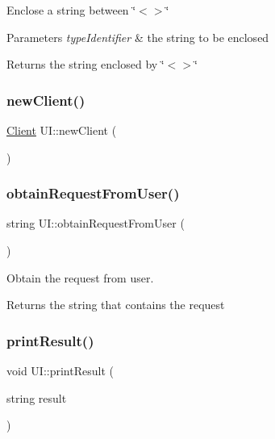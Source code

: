 Enclose a string between \char`\"{}$<$$>$\char`\"{} 
\begin{DoxyParams}{Parameters}
{\em type\+Identifier} & the string to be enclosed \\
\hline
\end{DoxyParams}
\begin{DoxyReturn}{Returns}
the string enclosed by \char`\"{}$<$$>$\char`\"{} 
\end{DoxyReturn}
\mbox{\label{classUI_acdfe48d32141de368744ddd75d41d82d}} 
\subsubsection{\texorpdfstring{new\+Client()}{newClient()}}
{\footnotesize\ttfamily \mbox{\hyperlink{classClient}{Client}} U\+I\+::new\+Client (\begin{DoxyParamCaption}{ }\end{DoxyParamCaption})\hspace{0.3cm}{\ttfamily [private]}}

\mbox{\label{classUI_a343fa5043d1f649ee433647539a721f0}} 
\subsubsection{\texorpdfstring{obtain\+Request\+From\+User()}{obtainRequestFromUser()}}
{\footnotesize\ttfamily string U\+I\+::obtain\+Request\+From\+User (\begin{DoxyParamCaption}{ }\end{DoxyParamCaption})\hspace{0.3cm}{\ttfamily [private]}}

Obtain the request from user. \begin{DoxyReturn}{Returns}
the string that contains the request 
\end{DoxyReturn}
\mbox{\label{classUI_aad7a4761b32253e43dcb76429deefcd3}} 
\subsubsection{\texorpdfstring{print\+Result()}{printResult()}}
{\footnotesize\ttfamily void U\+I\+::print\+Result (\begin{DoxyParamCaption}\item[{string}]{result }\end{DoxyParamCaption})\hspace{0.3cm}{\ttfamily [private]}}

